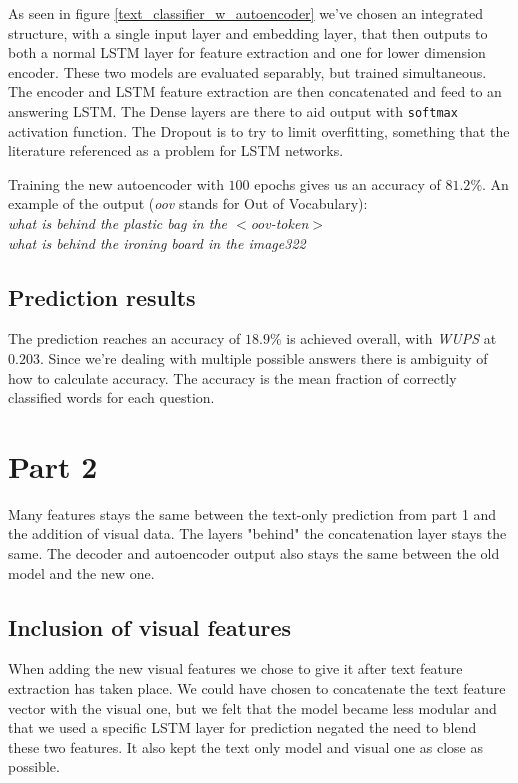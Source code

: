 \documentclass[10pt,a4paper]{report}
\begin{document}
	As seen in figure \ref{text_classifier_w_autoencoder} we've chosen an integrated structure, with a single input layer and embedding layer, that then outputs to both a normal LSTM layer for feature extraction and one for lower dimension encoder. These two models are evaluated separably, but trained simultaneous. The encoder and LSTM feature extraction are then concatenated and feed to an answering LSTM. The Dense layers are there to aid output with \texttt{softmax} activation function. The Dropout is to try to limit overfitting, something that the literature referenced as a problem for LSTM networks.
	
	Training the new autoencoder with $ 100 $ epochs gives us an accuracy of $ 81.2 \%$.  An example of the output (\textit{oov} stands for Out of Vocabulary):
	\\\textit{what is behind the plastic bag in the $ < $oov-token$ > $
	\\ what is behind the ironing board in the image322  }

	\subsection*{Prediction results}
	The prediction reaches an accuracy of $ 18.9 \% $ is achieved overall, with \textit{WUPS} at $ 0.203 $. Since we're dealing with multiple possible answers there is ambiguity of how to calculate accuracy. The accuracy is the mean fraction of correctly classified words for each question.


\pagebreak



	\section*{Part 2}
	Many features stays the same between the text-only prediction from part 1 and the addition of visual data. The layers "behind" the concatenation layer stays the same. The decoder and autoencoder output also stays the same between the old model and the new one.
	\subsection*{Inclusion of visual features}
	When adding the new visual features we chose to give it after text feature extraction has taken place. We could have chosen to concatenate the text feature vector with the visual one, but we felt that the model became less modular and that we used a specific LSTM layer for prediction negated the need to blend these two features. It also kept the text only model and visual one as close as possible. 
\end{document}
